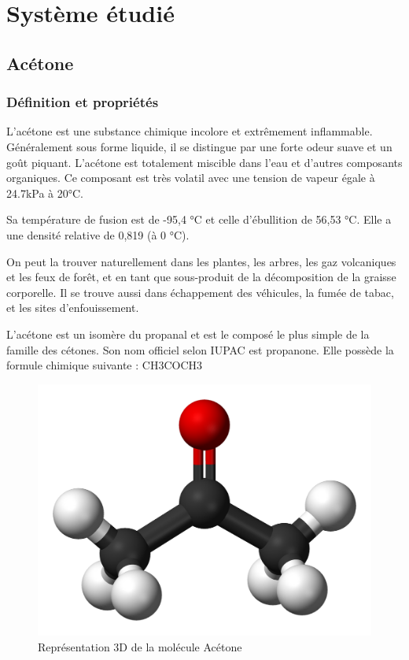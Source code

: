 \chapter{Système étudié}
\section{Acétone}
\subsection{Définition et propriétés}
L'acétone est une substance chimique incolore et extrêmement inflammable. Généralement sous forme liquide, il se distingue par une forte odeur suave et un goût piquant.  
L'acétone est totalement miscible dans l'eau et d'autres composants organiques. Ce composant est très volatil avec une tension de vapeur égale à 24.7kPa à 20°C.

Sa température de fusion est de -95,4 °C et celle d'ébullition de 56,53 °C. Elle a une densité relative de 0,819 (à 0 °C).
 
 On peut la trouver naturellement dans les plantes, les arbres, les gaz volcaniques et les feux de forêt, et en tant que sous-produit de la décomposition de la graisse corporelle. Il se trouve aussi dans échappement des véhicules, la fumée de tabac, et les sites d'enfouissement. 
 
L'acétone  est un isomère du propanal et est le composé le plus simple de la famille des cétones. Son nom officiel selon IUPAC est propanone. Elle possède la formule chimique suivante : CH3COCH3

\begin{figure}[h]
\centering
\includegraphics[scale=0.2]{./Figures/Acetone-3D-balls.png}
\caption{Représentation 3D de la molécule Acétone}
\end{figure}

